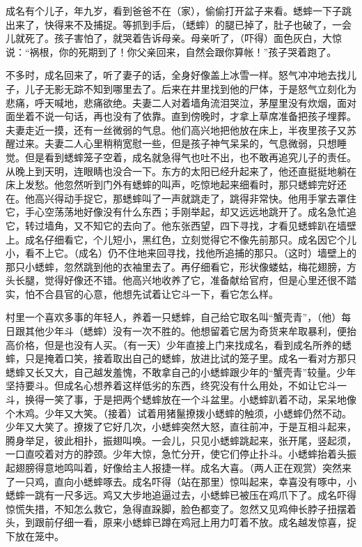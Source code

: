 \documentclass[12pt,UTF-8,openany,a4]{ctexbook}
\begin{document}
\begin{large}
    成名有个儿子，年九岁，看到爸爸不在（家），偷偷打开盆子来看。蟋蟀一下子跳出来了，快得来不及捕捉。等抓到手后，（蟋蟀）的腿已掉了，肚子也破了，一会儿就死了。孩子害怕了，就哭着告诉母亲。母亲听了，（吓得）面色灰白，大惊说：“祸根，你的死期到了！你父亲回来，自然会跟你算帐！”孩子哭着跑了。
    
    不多时，成名回来了，听了妻子的话，全身好像盖上冰雪一样。怒气冲冲地去找儿子，儿子无影无踪不知到哪里去了。后来在井里找到他的尸体，于是怒气立刻化为悲痛，呼天喊地，悲痛欲绝。夫妻二人对着墙角流泪哭泣，茅屋里没有炊烟，面对面坐着不说一句话，再也没有了依靠。直到傍晚时，才拿上草席准备把孩子埋葬。夫妻走近一摸，还有一丝微弱的气息。他们高兴地把他放在床上，半夜里孩子又苏醒过来。夫妻二人心里稍稍宽慰一些，但是孩子神气呆呆的，气息微弱，只想睡觉。但是看到蟋蟀笼子空着，成名就急得气也吐不出，也不敢再追究儿子的责任。从晚上到天明，连眼睛也没合一下。东方的太阳已经升起来了，他还直挺挺地躺在床上发愁。他忽然听到门外有蟋蟀的叫声，吃惊地起来细看时，那只蟋蟀完好还在。他高兴得动手捉它，那蟋蟀叫了一声就跳走了，跳得非常快。他用手掌去罩住它，手心空荡荡地好像没有什么东西；手刚举起，却又远远地跳开了。成名急忙追它，转过墙角，又不知它的去向了。他东张西望，四下寻找，才看见蟋蟀趴在墙壁上。成名仔细看它，个儿短小，黑红色，立刻觉得它不像先前那只。成名因它个儿小，看不上它。（成名）仍不住地来回寻找，找他所追捕的那只。（这时）墙壁上的那只小蟋蟀，忽然跳到他的衣袖里去了。再仔细看它，形状像蝼蛄，梅花翅膀，方头长腿，觉得好像还不错。他高兴地收养了它，准备献给官府，但是心里还很不踏实，怕不合县官的心意，他想先试着让它斗一下，看它怎么样。
    
    村里一个喜欢多事的年轻人，养着一只蟋蟀，自己给它取名叫“蟹壳青”，（他）每日跟其他少年斗（蟋蟀）没有一次不胜的。他想留着它居为奇货来牟取暴利，便抬高价格，但是也没有人买。（有一天）少年直接上门来找成名，看到成名所养的蟋蟀，只是掩着口笑，接着取出自己的蟋蟀，放进比试的笼子里。成名一看对方那只蟋蟀又长又大，自己越发羞愧，不敢拿自己的小蟋蟀跟少年的“蟹壳青”较量。少年坚持要斗。但成名心想养着这样低劣的东西，终究没有什么用处，不如让它斗一斗，换得一笑了事，于是把两个蟋蟀放在一个斗盆里。小蟋蟀趴着不动，呆呆地像个木鸡。少年又大笑。（接着）试着用猪鬣撩拨小蟋蟀的触须，小蟋蟀仍然不动。少年又大笑了。撩拨了它好几次，小蟋蟀突然大怒，直往前冲，于是互相斗起来，腾身举足，彼此相扑，振翅叫唤。一会儿，只见小蟋蟀跳起来，张开尾，竖起须，一口直咬着对方的脖颈。少年大惊，急忙分开，使它们停止扑斗。小蟋蟀抬着头振起翅膀得意地鸣叫着，好像给主人报捷一样。成名大喜。（两人正在观赏）突然来了一只鸡，直向小蟋蟀啄去。成名吓得（站在那里）惊叫起来，幸喜没有啄中，小蟋蟀一跳有一尺多远。鸡又大步地追逼过去，小蟋蟀已被压在鸡爪下了。成名吓得惊慌失措，不知怎么救它，急得直跺脚，脸色都变了。忽然又见鸡伸长脖子扭摆着头，到跟前仔细一看，原来小蟋蟀已蹲在鸡冠上用力叮着不放。成名越发惊喜，捉下放在笼中。
    

\end{large}
\end{document}
